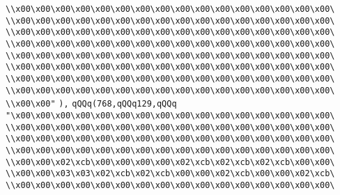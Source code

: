 \verb|\\x00\x00\x00\x00\x00\x00\x00\x00\x00\x00\x00\x00\x00\x00\x00\x00\|\newline
\verb|\\x00\x00\x00\x00\x00\x00\x00\x00\x00\x00\x00\x00\x00\x00\x00\x00\|\newline
\verb|\\x00\x00\x00\x00\x00\x00\x00\x00\x00\x00\x00\x00\x00\x00\x00\x00\|\newline
\verb|\\x00\x00\x00\x00\x00\x00\x00\x00\x00\x00\x00\x00\x00\x00\x00\x00\|\newline
\verb|\\x00\x00\x00\x00\x00\x00\x00\x00\x00\x00\x00\x00\x00\x00\x00\x00\|\newline
\verb|\\x00\x00\x00\x00\x00\x00\x00\x00\x00\x00\x00\x00\x00\x00\x00\x00\|\newline
\verb|\\x00\x00\x00\x00\x00\x00\x00\x00\x00\x00\x00\x00\x00\x00\x00\x00\|\newline
\verb|\\x00\x00\x00\x00\x00\x00\x00\x00\x00\x00\x00\x00\x00\x00\x00\x00\|\newline
\verb|\\x00\x00"|\newline
\verb|),|\newline
\verb|qQQq(768,qQQq129,qQQq|\newline
\verb|"\x00\x00\x00\x00\x00\x00\x00\x00\x00\x00\x00\x00\x00\x00\x00\x00\|\newline
\verb|\\x00\x00\x00\x00\x00\x00\x00\x00\x00\x00\x00\x00\x00\x00\x00\x00\|\newline
\verb|\\x00\x00\x00\x00\x00\x00\x00\x00\x00\x00\x00\x00\x00\x00\x00\x00\|\newline
\verb|\\x00\x00\x00\x00\x00\x00\x00\x00\x00\x00\x00\x00\x00\x00\x00\x00\|\newline
\verb|\\x00\x00\x02\xcb\x00\x00\x00\x00\x02\xcb\x02\xcb\x02\xcb\x00\x00\|\newline
\verb|\\x00\x00\x03\x03\x02\xcb\x02\xcb\x00\x00\x02\xcb\x00\x00\x02\xcb\|\newline
\verb|\\x00\x00\x00\x00\x00\x00\x00\x00\x00\x00\x00\x00\x00\x00\x00\x00\|\newline
